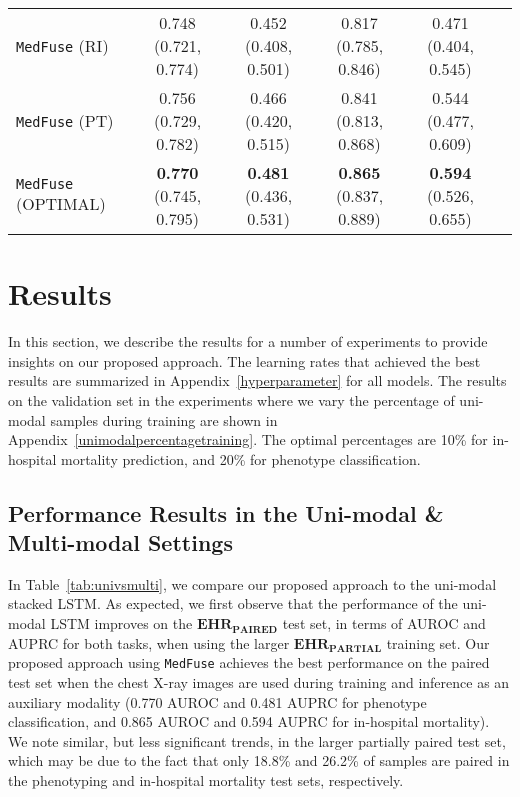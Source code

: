 \documentclass[pmlr]{jmlr}
\begin{document}
\begin{table*}[t!]
{\begin{tabular}{l c c | c  c c}
       \midrule
       \texttt{MedFuse} (RI) & 0.748 (0.721, 0.774)  & 0.452 (0.408, 0.501) & 0.817 (0.785, 0.846) & 0.471 (0.404, 0.545) \\  
       \texttt{MedFuse} (PT) &0.756 (0.729, 0.782) & 0.466 (0.420, 0.515) & 0.841 (0.813, 0.868) & 0.544 (0.477, 0.609) \\
       \texttt{MedFuse} (OPTIMAL) & \textbf{0.770} (0.745, 0.795) & \textbf{0.481} (0.436, 0.531) & \textbf{0.865} (0.837, 0.889) & \textbf{0.594} (0.526, 0.655) \\  
       \bottomrule
\end{tabular}}
    \label{tab:paired_res}
    \vspace{-4mm}
\end{table*}

\vspace{-0.5mm}
\section{Results}
\label{sec:res}
In this section, we describe the results for a number of experiments to provide insights on our proposed approach. The learning rates that achieved the best results are summarized in Appendix~\ref{hyperparameter} for all models. The results on the validation set in the experiments where we vary the percentage of uni-modal samples during training are shown in Appendix~\ref{unimodalpercentagetraining}. The optimal percentages are 10\% for in-hospital mortality prediction, and 20\% for phenotype classification. 

\vspace{-2mm}
\subsection{Performance Results in the Uni-modal \& Multi-modal Settings}
In Table~\ref{tab:univsmulti}, we compare our proposed approach to the uni-modal stacked LSTM. As expected, we first observe that the performance of the uni-modal LSTM improves on the $\mathbf{EHR}_{\mathbf{PAIRED}}$ test set, in terms of AUROC and AUPRC for both tasks, when using the larger $\mathbf{EHR}_{\mathbf{PARTIAL}}$ training set.  Our proposed approach using \texttt{MedFuse} achieves the best performance on the paired test set when the chest X-ray images are used during training and inference as an auxiliary modality (0.770 AUROC and 0.481 AUPRC for phenotype classification, and 0.865 AUROC and 0.594 AUPRC for in-hospital mortality). We note similar, but less significant trends, in the larger partially paired test set, which may be due to the fact that only 18.8\% and 26.2\% of samples are paired in the phenotyping and in-hospital mortality test sets, respectively. 
\end{document}

